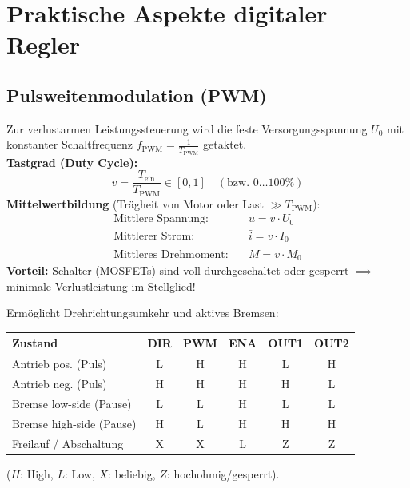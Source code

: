 \section{Praktische Aspekte digitaler Regler}

\subsection{Pulsweitenmodulation (PWM)}
\begin{tcolorbox}
Zur verlustarmen Leistungssteuerung wird die feste Versorgungsspannung $U_0$ mit konstanter Schaltfrequenz $f_{\text{PWM}} = \frac{1}{T_{\text{PWM}}}$ getaktet.\\[2pt]
\textbf{Tastgrad (Duty Cycle):}
\[
v = \frac{T_{\text{ein}}}{T_{\text{PWM}}} \in [0, 1] \quad (\text{bzw. } 0 \dots 100\%)
\]
\textbf{Mittelwertbildung} (Trägheit von Motor oder Last $\gg T_{\text{PWM}}$):
\begin{align*}
\text{Mittlere Spannung:} \quad &\bar{u} = v \cdot U_0 \\
\text{Mittlerer Strom:} \quad &\bar{i} = v \cdot I_0 \\
\text{Mittleres Drehmoment:} \quad &\bar{M} = v \cdot M_0
\end{align*}
\textbf{Vorteil:} Schalter (MOSFETs) sind voll durchgeschaltet oder gesperrt $\implies$ minimale Verlustleistung im Stellglied!
\end{tcolorbox}

\begin{tcolorbox}
Ermöglicht Drehrichtungsumkehr und aktives Bremsen:
\begin{center}
\small
\begin{tabularx}{\columnwidth}{l c c c c c}
\toprule
\textbf{Zustand} & \textbf{DIR} & \textbf{PWM} & \textbf{ENA} & \textbf{OUT1} & \textbf{OUT2} \\
\midrule
Antrieb pos. (Puls) & L & H & H & L & H \\
Antrieb neg. (Puls) & H & H & H & H & L \\
Bremse low-side (Pause) & L & L & H & L & L \\
Bremse high-side (Pause) & H & L & H & H & H \\
Freilauf / Abschaltung & X & X & L & Z & Z \\
\bottomrule
\end{tabularx}
\end{center}
\scriptsize ($H$: High, $L$: Low, $X$: beliebig, $Z$: hochohmig/gesperrt).
\end{tcolorbox}

